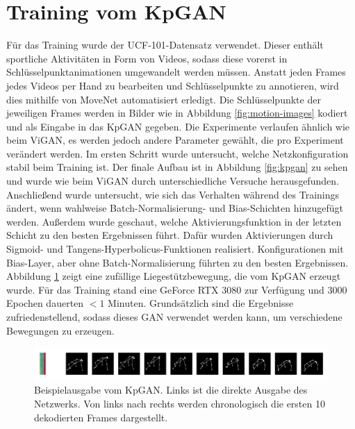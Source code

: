 \section{Training vom KpGAN}
Für das Training wurde der UCF-101-Datensatz \cite{ucf101} verwendet. Dieser
enthält sportliche Aktivitäten in Form von Videos, sodass diese vorerst in
Schlüsselpunktanimationen umgewandelt werden müssen. Anstatt jeden Frames jedes
Videos per Hand zu bearbeiten und Schlüsselpunkte zu annotieren, wird dies
mithilfe von MoveNet \cite{movenet} automatisiert erledigt. Die Schlüsselpunkte
der jeweiligen Frames werden in Bilder wie in Abbildung \ref{fig:motion-images}
kodiert und als Eingabe in das KpGAN gegeben. Die Experimente verlaufen ähnlich
wie beim ViGAN, es werden jedoch andere Parameter gewählt, die pro Experiment
verändert werden. Im ersten Schritt wurde untersucht, welche Netzkonfiguration
stabil beim Training ist. Der finale Aufbau ist in Abbildung \ref{fig:kpgan} zu
sehen und wurde wie beim ViGAN durch unterschiedliche Versuche herausgefunden.
Anschließend wurde untersucht, wie sich das Verhalten während des Trainings
ändert, wenn wahlweise Batch-Normalisierung- und Bias-Schichten hinzugefügt
werden.  Außerdem wurde geschaut, welche Aktivierungsfunktion in der letzten
Schicht zu den besten Ergebnissen führt. Dafür wurden Aktivierungen durch
Sigmoid- und Tangens-Hyperbolicus-Funktionen realisiert. Konfigurationen mit
Bias-Layer, aber ohne Batch-Normalisierung führten zu den besten Ergebnissen.
Abbildung \ref{fig:kpgan-example} zeigt eine zufällige Liegestützbewegung, die
vom KpGAN erzeugt wurde. Für das Training stand eine GeForce RTX 3080 zur
Verfügung und 3000 Epochen dauerten $< 1$ Minuten. Grundsätzlich sind die
Ergebnisse zufriedenstellend, sodass dieses GAN verwendet werden kann, um
verschiedene Bewegungen zu erzeugen.

\begin{figure}
    \includegraphics[width=\textwidth]{images/kpgan-example.png}
    \caption{Beispielausgabe vom KpGAN. Links ist die direkte Ausgabe des
    Netzwerks. Von links nach rechts werden chronologisch die ersten 10
    dekodierten Frames dargestellt.}
    \label{fig:kpgan-example}
\end{figure}

